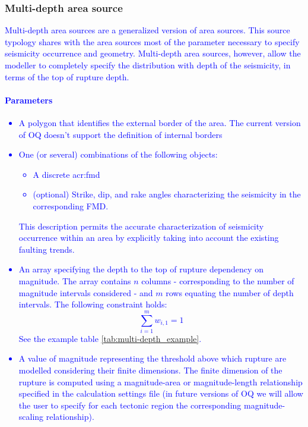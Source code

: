 \subsubsection[Multi-depth area sources]{Multi-depth area source}
\label{hazard:seismic_source_types:multiDepthAreaSources}
%
{\textcolor{blue}{
%
Multi-depth area sources are a generalized version of area sources. This
source typology shares with the area sources most of the parameter 
necessary to specify seismicity  occurrence and geometry. 
%
Multi-depth area sources, however, allow the modeller to completely specify 
the distribution with depth of the seismicity, in terms of the top of 
rupture depth.
%
\paragraph{Parameters}
\begin{itemize}
\item A polygon that identifies the external border of the area. 
The current version of OQ doesn't support the definition 
of internal borders
\item One (or several) combinations of the following objects:
\begin{itemize}
	\item A discrete \gls{acr:fmd}
	\item (optional) Strike, dip, and rake angles characterizing the 
	seismicity in the corresponding FMD.
\end{itemize}
%
This description permits the accurate characterization of seismicity 
occurrence within an area by explicitly taking into account the existing 
faulting trends. 
%
\item An array specifying the depth to the top of rupture dependency on 
magnitude. The array contains $n$ columns - corresponding to the number of 
magnitude intervals considered - and $m$ rows equating the number of depth
intervals. The following constraint holds:
\[\sum_{i=1}^{m}w_{i,1}=1\]
See the example table \ref{tab:multi-depth_example}.

%
\item A value of magnitude representing the threshold above which rupture 
are modelled considering their finite dimensions. The finite dimension of the 
rupture is computed using a magnitude-area or magnitude-length relationship 
specified in the calculation settings file (in future versions of OQ we will 
allow the user to specify for each tectonic region the corresponding 
magnitude-scaling relationship).
\end{itemize}
}} %
%
